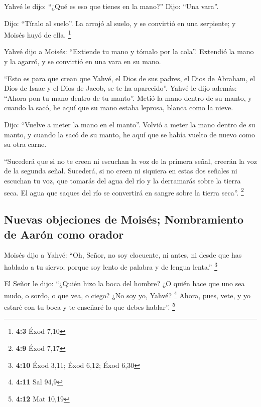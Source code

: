  Yahvé le dijo: ``¿Qué es eso que tienes en la mano?''
Dijo: ``Una vara''.

 Dijo: ``Tíralo al suelo''. La arrojó al suelo, y se
convirtió en una serpiente; y Moisés huyó de ella. \footnote{\textbf{4:3}
  Éxod 7,10}

 Yahvé dijo a Moisés: ``Extiende tu mano y tómalo por la
cola''. Extendió la mano y la agarró, y se convirtió en una vara en su
mano.

 ``Esto es para que crean que Yahvé, el Dios de sus
padres, el Dios de Abraham, el Dios de Isaac y el Dios de Jacob, se te
ha aparecido''.  Yahvé le dijo además: ``Ahora pon tu mano
dentro de tu manto''. Metió la mano dentro de su manto, y cuando la
sacó, he aquí que su mano estaba leprosa, blanca como la nieve.

 Dijo: ``Vuelve a meter la mano en el manto''. Volvió a
meter la mano dentro de su manto, y cuando la sacó de su manto, he aquí
que se había vuelto de nuevo como su otra carne.

 ``Sucederá que si no te creen ni escuchan la voz de la
primera señal, creerán la voz de la segunda señal. 
Sucederá, si no creen ni siquiera en estas dos señales ni escuchan tu
voz, que tomarás del agua del río y la derramarás sobre la tierra seca.
El agua que saques del río se convertirá en sangre sobre la tierra
seca''. \footnote{\textbf{4:9} Éxod 7,17}

\hypertarget{nuevas-objeciones-de-moisuxe9s-nombramiento-de-aaruxf3n-como-orador}{%
\subsection{Nuevas objeciones de Moisés; Nombramiento de Aarón como
orador}\label{nuevas-objeciones-de-moisuxe9s-nombramiento-de-aaruxf3n-como-orador}}

 Moisés dijo a Yahvé: ``Oh, Señor, no soy elocuente, ni
antes, ni desde que has hablado a tu siervo; porque soy lento de palabra
y de lengua lenta.'' \footnote{\textbf{4:10} Éxod 3,11; Éxod 6,12; Éxod
  6,30}

 El Señor le dijo: ``¿Quién hizo la boca del hombre? ¿O
quién hace que uno sea mudo, o sordo, o que vea, o ciego? ¿No soy yo,
Yahvé? \footnote{\textbf{4:11} Sal 94,9}  Ahora, pues,
vete, y yo estaré con tu boca y te enseñaré lo que debes hablar''.
\footnote{\textbf{4:12} Mat 10,19}

